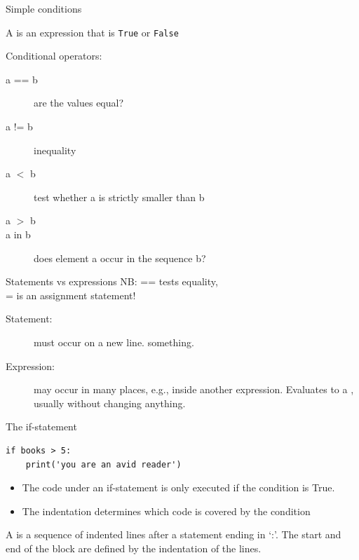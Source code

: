 \documentclass[aspectratio=169,usenames,dvipsnames]{beamer}
\begin{document}
\begin{frame}{Simple conditions}
    \begin{definition}
        A  is
        an expression that is \texttt{True} or \texttt{False}
    \end{definition}
    Conditional operators:
    \begin{description}
        \item[a == b] are the values equal?
        \item[a != b] inequality
        \item[a $<$ b] test whether a is strictly smaller than b
        \item[a $>$ b]
        \item[a in b] does element a occur in the sequence b?
    \end{description}

\end{frame}

\begin{frame}{Statements vs expressions}
    NB: == tests equality, \\
           = is an assignment statement!

    \begin{description}
        \item[Statement:] must occur on a new line.  something.
        \item[Expression:] may occur in many places, e.g., inside another expression.
            Evaluates to a , usually without changing anything.
    \end{description}
\end{frame}

\begin{frame}[fragile]{The if-statement}
\begin{lstlisting}
if books > 5:
    print('you are an avid reader')
\end{lstlisting}

    \begin{itemize}
        \item The code under an if-statement is only executed
            if the condition is True.
        \item The indentation determines which code is covered
            by the condition
    \end{itemize}

    \pause
    \begin{definition}
        A  is a sequence of indented lines after
        a statement ending in `:'.
        The start and end of the block are defined by the indentation of the
        lines.
    \end{definition}
\end{frame}
\end{document}
